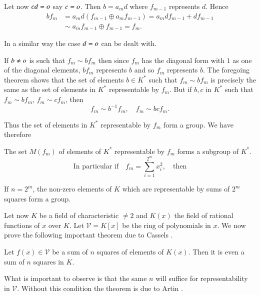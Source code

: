 \begin{Proof}
Let now $cd=o$ say $c=o$. Then $b=a_md$ where $f_{m-1}$ represents
$d$. Hence
\begin{equation*}
\begin{aligned}
bf_m&=a_md(f_{m-1}\oplus a_mf_{m-1})=a_mdf_{m-1}+df_{m-1}\\
&{} \sim a_mf_{m-1}\oplus f_{m-1}=f_m.
\end{aligned}
\end{equation*}

In a similar way the case $d=o$ can be dealt with.

If $b\neq o$ is such that $f_m\sim bf_m$ then since $f_m$ has the
diagonal form with $1$ as one of the diagonal elements, $bf_m$
represents $b$ and so $f_m$ represents $b$. The foregoing theorem
shows that the set of elements $b\in K^{\ast}$ such that $f_m\sim
bf_m$ is precisely the same as the set of elements in $K^{\ast}$
representable by $f_m$. But if $b, c$ in $K^{\ast}$ such that
$f_m\sim bf_m$, $f_m\sim cf_m$, then 
$$
f_m\sim b^{-1}f_m,\quad f_m\sim bc f_m.
$$

Thus the set of elements in $K^{\ast}$ representable by $f_m$ form a
group. We have therefore 
\enprf
\end{Proof}

\begin{cro}\label{cro1}
The set $M(f_m)$ of elements of $K^{\ast}$ representable by $f_m$
forms a subgroup of $K^{\ast}$.
$$
\text{In particular if}\quad f_m=\sum\limits^{2^{m}}_{i=1}x^{2}_i,
\quad \text{then}
$$
\end{cro}

\begin{cro}\label{cro2}
If $n=2^{m}$, the non-zero elements of $K$ which are representable by
sums of $2^{m}$ squares form a group.
\end{cro}

Let now $K$ be a field of characteristic $\neq 2$ and $K(x)$ the field
of rational functions of $x$ over $K$. Let $\mathcal{V}=K[x]$ be the
ring of polynomials in $x$. We now prove the following important
theorem due to Cassels \cite{key3}.

\begin{thm}[Cassels]\label{thm7}
Let $f(x)\in \mathcal{V}$ be a sum of $n$ squares of
  elements of $K(x)$. Then it is even a sum of $n$ squares in $K$.
\end{thm}

\begin{remnonum}
What is important to observe is that the same $n$ will suffice for
representability in $\mathcal{V}$. Without this condition the theorem
is due to Artin \cite{key1}.
\end{remnonum}


